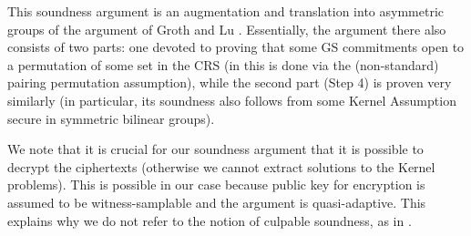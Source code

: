 This soundness argument is an augmentation and translation into asymmetric groups of the argument of Groth and Lu \cite{AC:GroLu07}. Essentially, the argument there also consists of two parts: one devoted to proving that some GS commitments open to a permutation of some set in the CRS (in \cite{AC:GroLu07} this is done via the (non-standard) pairing permutation assumption), while the second part (Step 4) is proven very similarly (in particular, its soundness also follows from some Kernel Assumption secure in symmetric bilinear groups). 

We note that it is crucial for our soundness argument that it is possible to decrypt the ciphertexts (otherwise we cannot extract solutions to the Kernel problems). This is possible in our case because public key for encryption is assumed to be witness-samplable and the argument is quasi-adaptive. This explains why we do not refer to the notion of culpable soundness, as in \cite{AC:GroLu07,EPRINT:FauLip15}.

